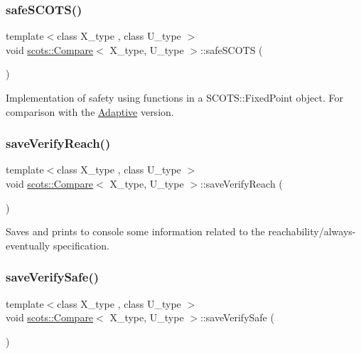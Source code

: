 \subsubsection{\texorpdfstring{safe\+S\+C\+O\+T\+S()}{safeSCOTS()}}
{\footnotesize\ttfamily template$<$class X\+\_\+type , class U\+\_\+type $>$ \\
void \hyperlink{classscots_1_1Compare}{scots\+::\+Compare}$<$ X\+\_\+type, U\+\_\+type $>$\+::safe\+S\+C\+O\+TS (\begin{DoxyParamCaption}{ }\end{DoxyParamCaption})\hspace{0.3cm}{\ttfamily [inline]}}

Implementation of safety using functions in a S\+C\+O\+T\+S\+::\+Fixed\+Point object. For comparison with the \hyperlink{classscots_1_1Adaptive}{Adaptive} version. \mbox{\label{classscots_1_1Compare_aa96846be5c881576f5add5ce32f7fe8a}} 
\subsubsection{\texorpdfstring{save\+Verify\+Reach()}{saveVerifyReach()}}
{\footnotesize\ttfamily template$<$class X\+\_\+type , class U\+\_\+type $>$ \\
void \hyperlink{classscots_1_1Compare}{scots\+::\+Compare}$<$ X\+\_\+type, U\+\_\+type $>$\+::save\+Verify\+Reach (\begin{DoxyParamCaption}{ }\end{DoxyParamCaption})\hspace{0.3cm}{\ttfamily [inline]}}

Saves and prints to console some information related to the reachability/always-\/eventually specification. \mbox{\label{classscots_1_1Compare_a9e79295cd6f8c7eed65d29ca2667cff9}} 
\subsubsection{\texorpdfstring{save\+Verify\+Safe()}{saveVerifySafe()}}
{\footnotesize\ttfamily template$<$class X\+\_\+type , class U\+\_\+type $>$ \\
void \hyperlink{classscots_1_1Compare}{scots\+::\+Compare}$<$ X\+\_\+type, U\+\_\+type $>$\+::save\+Verify\+Safe (\begin{DoxyParamCaption}{ }\end{DoxyParamCaption})\hspace{0.3cm}{\ttfamily [inline]}}

